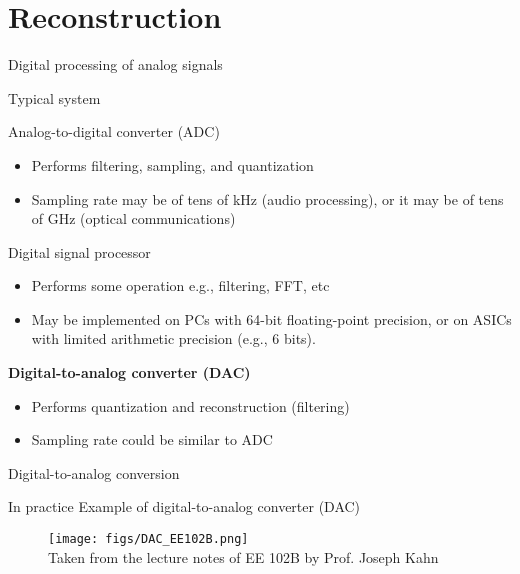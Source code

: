 \documentclass[10pt, aspectratio=169]{beamer}
\begin{document}
\section{Reconstruction}
\begin{frame}{Digital processing of analog signals}
\begin{block}{Typical system}
	\vspace{-0.7cm}
	\begin{center}
		\resizebox{0.7\linewidth}{!}{}
	\end{center}
\end{block}
\vspace{-0.5cm}
\begin{block}{Analog-to-digital converter (ADC)}
	\begin{itemize}
		\item Performs filtering, sampling, and quantization
		\item Sampling rate may be of tens of kHz (audio processing), or it may be of tens of GHz (optical communications)
	\end{itemize}
\end{block}
\vspace{-0.3cm}
\begin{block}{Digital signal processor}
	\begin{itemize} \itemsep 0pt
		\item Performs some operation e.g., filtering, FFT, etc
		\item May be implemented on PCs with 64-bit floating-point precision, or on ASICs with limited arithmetic precision (e.g., 6 bits).
	\end{itemize}
\end{block}
\vspace{-0.3cm}
\begin{block}{\textbf{Digital-to-analog converter (DAC)}}
	\begin{itemize}
		\item Performs quantization and reconstruction (filtering)
		\item Sampling rate could be similar to ADC
	\end{itemize}
\end{block}
\end{frame}

\begin{frame}{Digital-to-analog conversion}

\begin{block}{In practice}
	Example of digital-to-analog converter (DAC)
	\begin{figure}
		\centering
		\texttt{[image: figs/DAC\_EE102B.png]}\\
		{\tiny \color{gray} Taken from the lecture notes of EE 102B by Prof. Joseph Kahn}
	\end{figure}
\end{block}

\end{frame}
\end{document}

